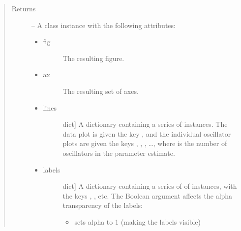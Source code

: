 \documentclass[letterpaper,10pt,english]{sphinxmanual}
\begin{document}
\begin{fulllineitems}
\begin{quote}
\begin{description}
\begin{itemize}
\end{itemize}

\item[{Returns}] \leavevmode
\sphinxAtStartPar

\sphinxAtStartPar
{} – A class instance with the following attributes:
\begin{itemize}
\item {} \begin{description}
\item[{fig}] \leavevmode{[}\sphinxhref{https://matplotlib.org/3.3.1/api/\_as\_gen/matplotlib.figure.Figure.html}{matplotlib.figure.Figure}{]}
\sphinxAtStartPar
The resulting figure.

\end{description}

\item {} \begin{description}
\item[{ax}] \leavevmode{[}\sphinxhref{https://matplotlib.org/3.3.1/api/axes\_api.html\#matplotlib.axes.Axes}{matplotlib.axes.Axes}{]}
\sphinxAtStartPar
The resulting set of axes.

\end{description}

\item {} \begin{description}
\item[{lines}] \leavevmode{[}dict{]}
\sphinxAtStartPar
A dictionary containing a series of
instances. The data plot is given the key , and the
individual oscillator plots are given the keys ,
, , …,  where  is the number of
oscillators in the parameter estimate.

\end{description}

\item {} \begin{description}
\item[{labels}] \leavevmode{[}dict{]}
\sphinxAtStartPar
A dictionary containing a series of
of  instances, with the
keys , , etc. The Boolean argument  affects the
alpha transparency of the labels:
\begin{itemize}
\item {} 
\sphinxAtStartPar
{} sets alpha to 1 (making the labels visible)


\end{itemize}
\end{description}
\end{itemize}
\end{description}
\end{quote}
\end{fulllineitems}
\end{document}
